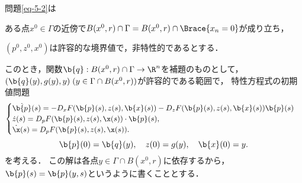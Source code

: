 \documentclass[uplatex,dvipdfmx]{jsreport}
\begin{document}
\begin{problem}\label{problem-5-4}
    問題\ref{eq-5-2}は
    \begin{enumerate}[{[A}1{]}]
        \item ある点$x^0\in\Gamma$の近傍で$B(x^0,r)\cap\Gamma=B(x^0,r)\cap\Brace{x_n=0}$が成り立ち，
        \item $(p^0,z^0,x^0)$は許容的な境界値で，非特性的であるとする．
    \end{enumerate}
    このとき，関数$\b{q}:B(x^0,r)\cap\Gamma\to\R^n$を補題のものとして，
    $(\b{q}(y),g(y),y)\;(y\in\Gamma\cap B(x^0,r))$が許容的である範囲で，
    特性方程式の初期値問題
    \[\begin{cases}
        \dot{\b{p}}(s)=-D_xF(\b{p}(s),z(s),\b{x}(s))-D_zF(\b{p}(s),z(s),\b{x}(s))\b{p}(s)\\
        \dot{z}(s)=D_pF(\b{p}(s),z(s),\x(s))\cdot\b{p}(s),\\
        \dot{\x}(s)=D_pF(\b{p}(s),z(s),\x(s)).
    \end{cases}\]
    \[\b{p}(0)=\b{q}(y),\quad z(0)=g(y),\quad\b{x}(0)=y.\]
    を考える．
    この解は各点$y\in\Gamma\cap B(x^0,r)$に依存するから，$\b{p}(s)=\b{p}(y,s)$というように書くこととする．
\end{problem}
\end{document}
